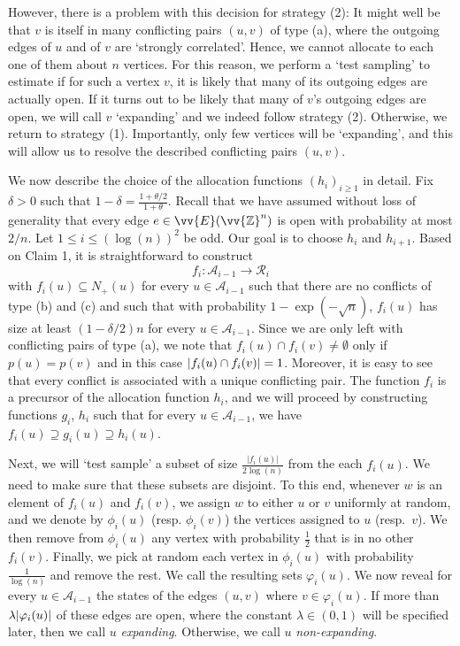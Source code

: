 \documentclass[11pt]{article}
\newcommand{\Z}{\mathbb{Z}}
\newcommand{\A}{\mathcal{A}}
\DeclarePairedDelimiter{\abs}{\lvert}{\rvert}
\theoremstyle{remark}
\begin{document}
However, there is a problem with this decision for strategy (2): It might well be that $v$ is itself in many conflicting pairs $(u,v)$ of type (a), where the outgoing edges of $u$ and of $v$ are `strongly correlated'. Hence, we cannot allocate to each one of them about $n$ vertices. For this reason, we perform a `test sampling' to estimate if for such a vertex $v$, it is likely that many of its outgoing edges are actually open. If it turns out to be likely that many of $v$'s outgoing edges are open, we will call $v$ `expanding' and we indeed follow strategy (2). Otherwise, we return to strategy (1). Importantly, only few vertices will be `expanding', and this will allow us to resolve the described conflicting pairs $(u,v)$. 

We now describe the choice of the allocation functions $(h_i)_{i\ge 1}$ in detail. Fix $\delta>0$ such that $1-\delta = \frac{1+\theta/2}{1+\theta}$. Recall that we have assumed without loss of generality that every edge $e \in \vv{E}(\vv{\Z}^n)$ is open with probability at most $2/n$. 
Let $1 \le i \le (\log(n))^2$ be odd. Our goal is to choose $h_i$ and $h_{i+1}$. Based on Claim 1, it is straightforward to construct 
\begin{equation}
    f_i : \A_{i-1} \to \mathcal R_i
\end{equation}
with $f_i(u) \subseteq N_+(u)$ for every $u \in \A_{i-1}$ such that there are no conflicts of type (b) and (c) and such that with probability $1-\exp(-\sqrt{n})$, $f_i(u)$ has size at least $(1-\delta/2)n$ for every $u \in \A_{i-1}$. Since we are only left with conflicting pairs of type (a), we note that $f_i(u) \cap f_i(v) \neq \emptyset$ only if $p(u) =p(v)$ and in this case $\abs{f_i(u) \cap f_i(v)}=1$. Moreover, it is easy to see that every conflict is associated with a unique conflicting pair.
The function $f_i$ is a precursor of the allocation function $h_i$, and we will proceed by constructing functions $g_i$, $h_i$ such that for every $u \in \A_{i-1}$, we have $f_i(u) \supseteq g_i(u) \supseteq h_i(u)$. 

Next, we will `test sample' a subset of size $\frac{|f_i(u)|}{2 \log(n)}$ from the each $f_i(u)$. We need to make sure that these subsets are disjoint. To this end, whenever $w$ is an element of $f_i(u)$  and $f_i(v)$, we assign $w$ to either $u$ or $v$ uniformly at random, and we denote by $\phi_i(u)$ (resp. $\phi_i(v)$) the vertices assigned to $u$ (resp.\ $v$). We then remove from $\phi_i(u)$ any vertex with probability $\frac{1}{2}$ that is in no other $f_i(v)$. Finally, we pick at random each vertex in $\phi_i(u)$ with probability $\frac{1}{\log(n)}$ and remove the rest. We call the resulting sets $\varphi_i(u)$. We now reveal for every $u \in \A_{i-1}$ the states of the edges $(u,v)$ where $v \in \varphi_i(u)$. If more than $\lambda \abs{\varphi_i(u)}$ of these edges are open, where the constant $\lambda \in (0,1)$ will be specified later, then we call $u$ \emph{expanding}. Otherwise, we call $u$ \emph{non-expanding}.
\end{document}
